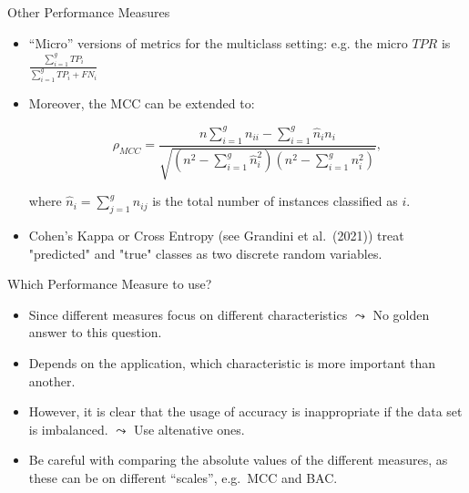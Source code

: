 \documentclass[11pt,compress,t,notes=noshow, xcolor=table]{beamer}
\begin{document}
\begin{vbframe}{Other Performance Measures}

	\small{

		\begin{itemize}
		
			\item ``Micro'' versions of metrics for the multiclass setting: e.g. the micro $TPR$ is $\frac{\sum_{i=1}^g TP_i}{\sum_{i=1}^g TP_i + FN_i}$ 
            \vspace{10pt}
		
			\item Moreover, the MCC can be extended to:
			
			$$   \rho_{MCC} = \frac{ n  \sum_{i=1}^g n_{ii} -  \sum_{i=1}^g \hat n_i n_i}{\sqrt{ (n^2 - \sum_{i=1}^g \hat n_i^2)(n^2 - \sum_{i=1}^g n_i^2)  }},$$

			where $\hat n_i = \sum_{j=1}^g n_{ij}$ is the total number of instances classified as $i.$
            \vspace{10pt}
        
		
			\item Cohen's Kappa or Cross Entropy (see Grandini et al.\ (2021)) treat "predicted" and "true" classes as two discrete random variables.
		
		\end{itemize}
	}
\end{vbframe}


\begin{vbframe}{Which Performance Measure to use?}

	\small{

		\begin{itemize}

            \item Since different measures focus on different characteristics $\leadsto$ No golden answer to this question.
	
			\item Depends on the application, which characteristic is more important than another.

			\item However, it is clear that the usage of accuracy is inappropriate if the data set is imbalanced. $\leadsto$ Use altenative ones.

			\item Be careful with comparing the absolute values of the different measures, as these can be on different ``scales'', e.g.\ MCC and BAC. 
	
		\end{itemize}
	}
\end{vbframe}



%
\endlecture
\end{document}
